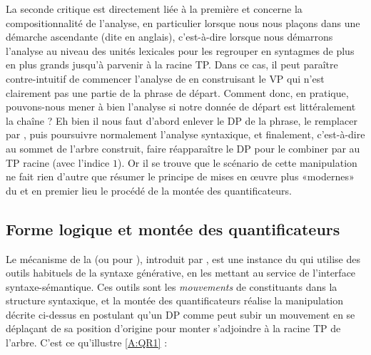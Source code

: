 La seconde critique est directement liée à la première et concerne la compositionnalité de l'analyse, en particulier lorsque nous nous plaçons dans une démarche ascendante (dite  en anglais), c'est-à-dire lorsque nous démarrons l'analyse au niveau des unités lexicales pour les regrouper en syntagmes de plus en plus grands jusqu'à parvenir à la racine TP. 
Dans ce cas, il peut paraître contre-intuitif de commencer l'analyse de  en construisant le {VP}  qui n'est clairement pas une partie de la phrase de départ.  
Comment donc, en pratique, pouvons-nous mener à bien l'analyse si notre donnée de départ est littéralement la chaîne  ?   Eh bien il nous faut d'abord enlever le DP  de la phrase, le remplacer par , puis poursuivre normalement l'analyse syntaxique, et finalement, c'est-à-dire au sommet de l'arbre construit, faire réapparaître le DP pour le combiner par  au TP racine (avec l'indice $1$). 
Or il se trouve que le scénario de cette manipulation %
ne fait rien d'autre que résumer le principe de mises en œuvre plus «modernes» du  et en premier lieu le procédé de la montée des quantificateurs.





\subsection{Forme logique et montée des quantificateurs}
\label{sss:QR}

Le mécanisme de la  (ou  pour ), introduit par \citet{May:77}, est une instance du  
qui utilise des outils habituels de la syntaxe générative, en les mettant au service de l'interface syntaxe-sémantique. 
Ces outils sont les \emph{mouvements} de constituants dans la structure syntaxique, et la montée des quantificateurs réalise la manipulation décrite ci-dessus 
en postulant qu'un DP comme  peut subir un mouvement en se déplaçant de sa position d'origine pour monter s'adjoindre à la racine TP de l'arbre.
C'est ce qu'illustre \ref{A:QR1} :

